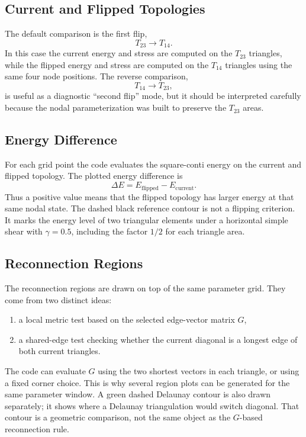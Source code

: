 \documentclass[11pt]{article}
\begin{document}
\subsection{Current and Flipped Topologies}

The default comparison is the first flip,
\[
    T_{23}\longrightarrow T_{14}.
\]
In this case the current energy and stress are computed on the \(T_{23}\)
triangles, while the flipped energy and stress are computed on the \(T_{14}\)
triangles using the same four node positions. The reverse comparison,
\[
    T_{14}\longrightarrow T_{23},
\]
is useful as a diagnostic ``second flip'' mode, but it should be interpreted
carefully because the nodal parameterization was built to preserve the
\(T_{23}\) areas.

\subsection{Energy Difference}

For each grid point the code evaluates the square-conti energy on the current
and flipped topology. The plotted energy difference is
\[
    \Delta E
      =
      E_{\mathrm{flipped}}-E_{\mathrm{current}}.
\]
Thus a positive value means that the flipped topology has larger energy at
that same nodal state. The dashed black reference contour is not a flipping
criterion. It marks the energy level of two triangular elements under a
horizontal simple shear with \(\gamma=0.5\), including the factor \(1/2\) for
each triangle area.

\subsection{Reconnection Regions}

The reconnection regions are drawn on top of the same parameter grid. They
come from two distinct ideas:
\begin{enumerate}
    \item a local metric test based on the selected edge-vector matrix \(G\),
    \item a shared-edge test checking whether the current diagonal is a
          longest edge of both current triangles.
\end{enumerate}
The code can evaluate \(G\) using the two shortest vectors in each triangle,
or using a fixed corner choice. This is why several region plots can be
generated for the same parameter window. A green dashed Delaunay contour is
also drawn separately; it shows where a Delaunay triangulation would switch
diagonal. That contour is a geometric comparison, not the same object as the
\(G\)-based reconnection rule.
\end{document}
